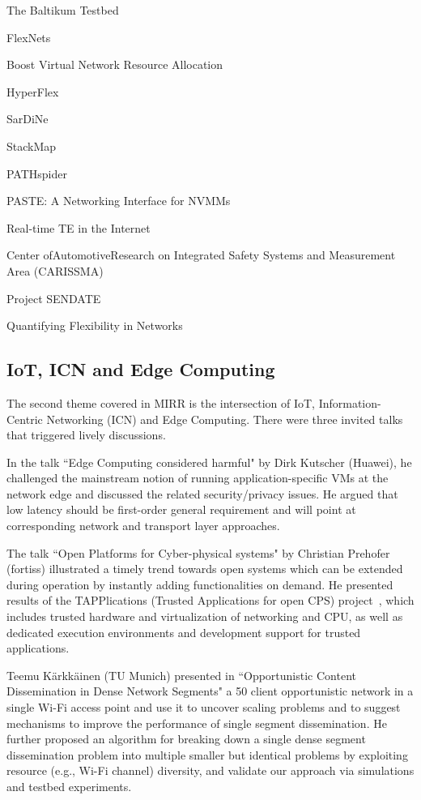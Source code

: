 The Baltikum Testbed

FlexNets

Boost Virtual Network Resource Allocation

HyperFlex

SarDiNe

StackMap

PATHspider

PASTE: A Networking Interface for NVMMs

Real-time TE in the Internet

Center ofAutomotiveResearch on Integrated Safety Systems
and Measurement Area (CARISSMA)

Project SENDATE

Quantifying Flexibility in Networks


\subsection{IoT, ICN and Edge Computing}

The second theme covered in MIRR is the intersection of IoT, Information-Centric
Networking (ICN) and Edge Computing. There were three invited talks that triggered
lively discussions. 

In the talk ``Edge Computing considered harmful" by Dirk
Kutscher (Huawei), he challenged the mainstream notion of running
application-specific VMs at the network edge and discussed the related
security/privacy issues. He argued that low latency should be first-order
general requirement and will point at corresponding network and
transport layer approaches.

The talk ``Open Platforms for Cyber-physical systems" by Christian Prehofer (fortiss)
illustrated a timely trend towards open systems
which can be extended during operation by instantly adding functionalities on
demand. He presented results of the
TAPPlications (Trusted Applications for open CPS) project~\cite{prehofer:eitec:2016},
which includes trusted hardware and
virtualization of networking and CPU, as well as dedicated execution
environments and development support for trusted applications.

Teemu Kärkkäinen (TU Munich) presented in ``Opportunistic Content
Dissemination in Dense Network Segments" a 50 client opportunistic network in
a single Wi-Fi access point and use it to uncover scaling problems and to suggest
mechanisms to improve the performance of single segment dissemination. He further
proposed an algorithm for breaking down a single dense segment dissemination
problem into multiple smaller but identical problems by exploiting resource 
(e.g., Wi-Fi channel) diversity, and validate our approach via simulations and
testbed experiments.

